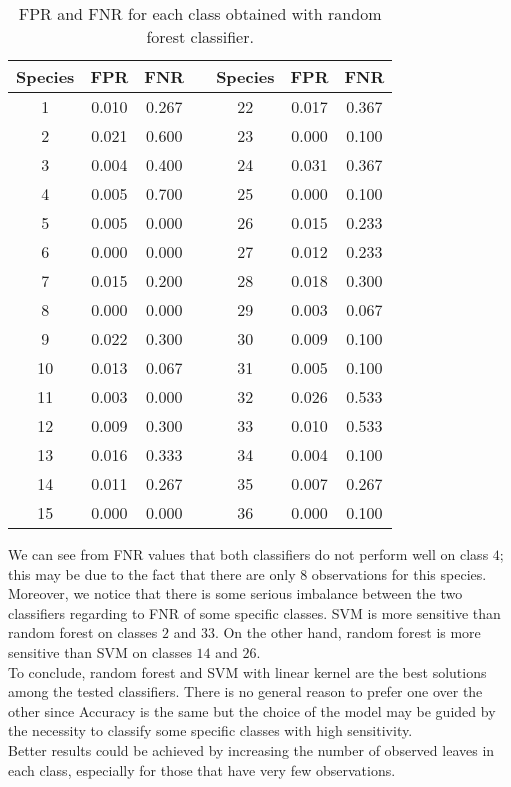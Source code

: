 \documentclass{article}
\begin{document}
\begin{table}[h]
\begin{minipage}[]{7cm}
\end{minipage}
\hfill
\begin{minipage}[]{7cm}
\begin{tabular}{ |c|c|c|c|c|c|c| } \hline
Species & FPR & FNR & & Species & FPR & FNR \\
\hline
1 & 0.010 & 0.267 & & 22 & 0.017 & 0.367 \\ 
\hline
2 & 0.021 & 0.600 & & 23 & 0.000 & 0.100\\ 
\hline
 3 & 0.004 & 0.400 & & 24 & 0.031 & 0.367 \\ 
\hline
 4 & 0.005 & 0.700 & & 25 & 0.000 & 0.100\\ 
\hline
 5 &  0.005 & 0.000 & & 26 & 0.015 & 0.233 \\ 
\hline
 6 & 0.000 & 0.000 & & 27 & 0.012 & 0.233 \\ 
\hline
 7 & 0.015 & 0.200 & & 28 & 0.018 & 0.300\\ 
\hline
 8 & 0.000 & 0.000 & & 29 & 0.003 & 0.067\\ 
\hline
 9 & 0.022 & 0.300 & & 30 & 0.009& 0.100\\ 
\hline
 10 & 0.013 & 0.067 & & 31 &  0.005 & 0.100\\ 
\hline
 11 & 0.003 & 0.000 & & 32 & 0.026 & 0.533\\ 
\hline
 12 & 0.009 & 0.300 & & 33 & 0.010 & 0.533\\ 
\hline
 13 & 0.016 & 0.333 & & 34 & 0.004 & 0.100\\ 
\hline
 14 & 0.011 & 0.267 & & 35 & 0.007 & 0.267\\ 
\hline
 15 & 0.000 & 0.000 & & 36 & 0.000 & 0.100\\ 
\hline
\end{tabular}
\caption{FPR and FNR for each class obtained with random forest classifier.}\label{table4}
\end{minipage}

\end{table}

We can see from FNR values that both classifiers do not perform well on class $4$; this may be due to the fact that there are only $8$ observations for this species. Moreover, we notice that there is some serious imbalance between the two classifiers regarding to FNR of some specific classes. SVM is more sensitive than random forest on classes $2$ and $33$. On the other hand, random forest is more sensitive than SVM on classes $14$ and $26$. 
\\To conclude, random forest and SVM with linear kernel are the best solutions among the tested classifiers. There is no general reason to prefer one over the other since Accuracy is the same but the choice of the model may be guided by the necessity to classify some specific classes with high sensitivity.
\\Better results could be achieved by increasing the number of observed leaves in each class, especially for those that have very few observations.


\newpage


\end{document}
